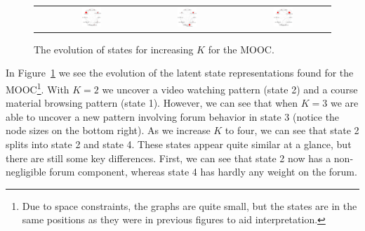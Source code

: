 \begin{figure}
\begin{tabular}{cccc}
    &
    \includegraphics[width=0.22\textwidth]{figures/text-4state/state1.png}
    &
    \includegraphics[width=0.22\textwidth]{figures/text-4state/state2.png}
    &
    \includegraphics[width=0.22\textwidth]{figures/text-4state/state3.png}
  \end{tabular}
  \caption{The evolution of states for increasing $K$ for the
  \protect\textretrieval{} MOOC.} %
  \label{fig:text-state-evolution}
\end{figure}

In Figure~\ref{fig:text-state-evolution} we see the evolution of the latent
state representations found for the \textretrieval{} MOOC\footnote{Due to
space constraints, the graphs are quite small, but the states are in the
same positions as they were in previous figures to aid interpretation.}.
With $K=2$ we uncover a video watching pattern (state 2) and a course
material browsing pattern (state 1). However, we can see that when $K=3$ we
are able to uncover a new pattern involving forum behavior in state 3
(notice the node sizes on the bottom right). As we increase $K$ to four, we
can see that state 2 splits into state 2 and state 4. These states appear
quite similar at a glance, but there are still some key differences. First,
we can see that state 2 now has a non-negligible forum component, whereas
state 4 has hardly any weight on the forum.

